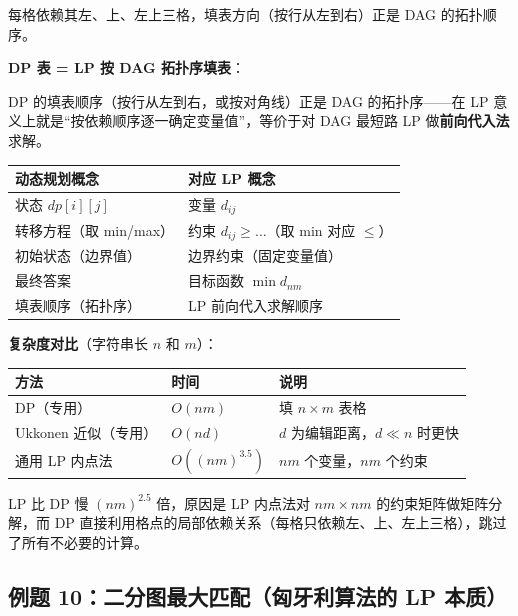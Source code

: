 \documentclass[12pt, a4paper]{ctexart}
\begin{document}
\begin{blackboard}
\medskip
每格依赖其左、上、左上三格，填表方向（按行从左到右）正是 DAG 的拓扑顺序。

\textbf{DP 表 = LP 按 DAG 拓扑序填表}：

DP 的填表顺序（按行从左到右，或按对角线）正是 DAG 的拓扑序——在 LP 意义上就是``按依赖顺序逐一确定变量值''，等价于对 DAG 最短路 LP 做\textbf{前向代入法}求解。

\begin{keypoint}[DP 与 LP 的一一对应]
\begin{center}
\begin{tabular}{ll}
\toprule
动态规划概念 & 对应 LP 概念 \\
\midrule
状态 $dp[i][j]$ & 变量 $d_{ij}$ \\
转移方程（取 min/max） & 约束 $d_{ij} \geq \ldots$（取 min 对应 $\leq$） \\
初始状态（边界值） & 边界约束（固定变量值） \\
最终答案 & 目标函数 $\min d_{nm}$ \\
填表顺序（拓扑序） & LP 前向代入求解顺序 \\
\bottomrule
\end{tabular}
\end{center}
\end{keypoint}

\textbf{复杂度对比}（字符串长 $n$ 和 $m$）：

\begin{center}
\begin{tabular}{lll}
\toprule
方法 & 时间 & 说明 \\
\midrule
DP（专用） & $O(nm)$ & 填 $n \times m$ 表格 \\
Ukkonen 近似（专用） & $O(nd)$ & $d$ 为编辑距离，$d \ll n$ 时更快 \\
通用 LP 内点法 & $O((nm)^{3.5})$ & $nm$ 个变量，$nm$ 个约束 \\
\bottomrule
\end{tabular}
\end{center}

LP 比 DP 慢 $(nm)^{2.5}$ 倍，原因是 LP 内点法对 $nm \times nm$ 的约束矩阵做矩阵分解，而 DP 直接利用格点的局部依赖关系（每格只依赖左、上、左上三格），跳过了所有不必要的计算。

\end{blackboard}

\subsection{例题 10：二分图最大匹配（匈牙利算法的 LP 本质）}
\end{document}
